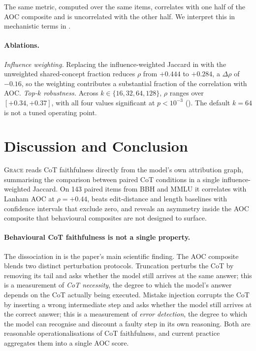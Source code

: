 \documentclass{article}
\newcommand{\GRACE}{\textsc{Grace}}
\begin{document}
The same metric, computed over the same items, correlates with one
half of the AOC composite and is uncorrelated with the other half. We
interpret this in mechanistic terms in .

\paragraph{Ablations.}
\textit{Influence weighting.} Replacing the influence-weighted Jaccard
in  with the unweighted shared-concept fraction reduces
$\rho$ from ${+}0.444$ to ${+}0.284$, a $\Delta\rho$ of ${-}0.16$, so
the weighting contributes a substantial fraction of the correlation
with AOC. \textit{Top-$k$ robustness.} Across
$k \in \{16, 32, 64, 128\}$, $\rho$ ranges over $[{+}0.34, {+}0.37]$,
with all four values significant at $p < 10^{-3}$
(). The default $k = 64$ is not a tuned operating point.

\FloatBarrier
\section{Discussion and Conclusion}
\label{sec:discussion}

\GRACE{} reads CoT faithfulness directly from the model's own
attribution graph, summarising the comparison between paired CoT
conditions in a single influence-weighted Jaccard. On 143 paired items
from BBH and MMLU it correlates with Lanham AOC at
$\rho = {+}0.44$, beats edit-distance and length baselines with
confidence intervals that exclude zero, and reveals an asymmetry
inside the AOC composite that behavioural composites are not designed
to surface.

\paragraph{Behavioural CoT faithfulness is not a single property.}
The dissociation in  is the paper's main
scientific finding. The AOC composite blends two distinct perturbation
protocols. Truncation perturbs the CoT by removing its tail and asks
whether the model still arrives at the same answer; this is a
measurement of \emph{CoT necessity}, the degree to which the model's
answer depends on the CoT actually being executed. Mistake injection
corrupts the CoT by inserting a wrong intermediate step and asks
whether the model still arrives at the correct answer; this is a
measurement of \emph{error detection}, the degree to which the model
can recognise and discount a faulty step in its own reasoning. Both
are reasonable operationalisations of CoT faithfulness, and current
practice aggregates them into a single AOC score.
\end{document}
